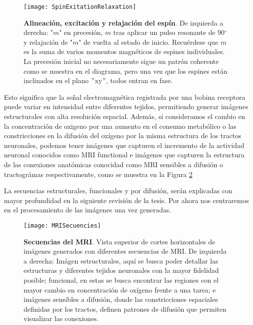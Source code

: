 \documentclass[11pt,letterpaper]{article}
\numberwithin{equation}{subsection}
\numberwithin{table}{subsection}
\begin{document}
\begin{figure}[H]
\centering
	\texttt{[image: SpinExitationRelaxation]}
	\captionsetup{labelfont=bf}
	\caption{\scriptsize \textbf{Alineación, excitación y relajación del espín}. De izquierda a derecha: "$m$" en precesión, $m$ tras aplicar un pulso resonante de 90$^{\circ}$ y relajación de "$m$" de vuelta al estado de inicio. Recuérdese que $m$ es la suma de varios momentos magnéticos de espines individuales. La precesión inicial no necesariamente sigue un patrón coherente como se muestra en el diagrama, pero una vez que los espines están inclinados en el plano $"$xy$"$, todos entran en fase.}
	\label{fig:Fig8}
\end{figure}

\bigskip
\noindent Esto significa que la señal electromagnética registrada por una bobina receptora puede variar en intensidad entre diferentes tejidos, permitiendo generar imágenes estructurales con alta resolución espacial. Además, si consideramos el cambio en la concentración de oxigeno por una aumento en el consumo metabólico o las constricciones en la difusión del oxígeno por la misma estructura de los tractos neuronales, podemos tener imágenes que capturen el incremento de la actividad neuronal conocidos como MRI functional e imágenes que capturen la estructura de las conexiones anatómicas conocidad como MRI sensibles a difusión o tractográmas respectivamente, como se muestra en la Figura \ref{fig:Fig9}

\bigskip
\noindent La secuencias estructurales, funcionales y por difusión, serán explicadas con mayor profundidad en la siguiente revisión de la tesis. Por ahora nos centraremos en el procesamiento de las imágenes una vez generadas.  

\begin{figure}[H]
\centering
	\texttt{[image: MRISecuencies]}
	\captionsetup{labelfont=bf}
	\caption{\scriptsize \textbf{Secuencias del MRI}. Vista superior de cortes horizontales de imágenes generados con diferentes secuencias de MRI. De izquierda a derecha: Imágen estructurales, aquí se busca poder detallar las estructuras y diferentes tejidos neuronales con la mayor fidelidad posible; funcional, en estas se busca encontrar las regiones con el mayor cambio en concentración de oxígeno frente a una tarea; e imágenes sensibles a difusión, donde las constricciones espaciales definidas por los tractos, definen patrones de difusión que permiten visualizar las conexiones.}
	\label{fig:Fig9}
\end{figure}
\end{document}
